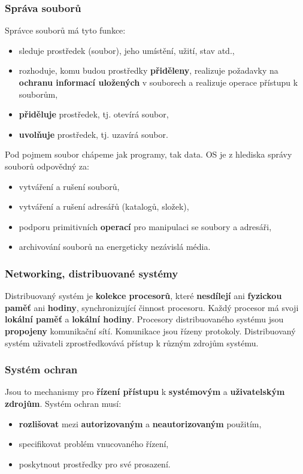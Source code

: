 \subsubsection{Správa souborů}
Správce souborů má tyto funkce:
\begin{itemize}
	\item sleduje prostředek (soubor), jeho umístění, užití, stav atd.,
	\item rozhoduje, komu budou prostředky \textbf{přiděleny}, realizuje požadavky na \textbf{ochranu informací uložených} v souborech a realizuje operace přístupu k souborům,
	\item \textbf{přiděluje} prostředek, tj. otevírá soubor,
	\item \textbf{uvolňuje} prostředek, tj. uzavírá soubor.
\end{itemize}
Pod pojmem soubor chápeme jak programy, tak data. OS je z hlediska správy souborů odpovědný za:
\begin{itemize}
	\item vytváření a rušení souborů,
	\item vytváření a rušení adresářů (katalogů, složek),
	\item podporu primitivních \textbf{operací} pro manipulaci se soubory a adresáři,
	\item archivování souborů na energeticky nezávislá média.
\end{itemize}
\subsubsection{Networking, distribuované systémy}
Distribuovaný systém je \textbf{kolekce procesorů}, které \textbf{nesdílejí} ani \textbf{fyzickou paměť} ani \textbf{hodiny}, synchronizující činnost procesoru. Každý procesor má svoji \textbf{lokální paměť} a \textbf{lokální hodiny}. Procesory distribuovaného systému jsou \textbf{propojeny} komunikační sítí. Komunikace jsou řízeny protokoly. Distribuovaný systém uživateli zprostředkovává přístup k různým zdrojům systému.

\subsubsection{Systém ochran}
Jsou to mechanismy pro \textbf{řízení přístupu} k \textbf{systémovým} a \textbf{uživatelským zdrojům}. Systém ochran musí:
\begin{itemize}
	\item \textbf{rozlišovat} mezi \textbf{autorizovaným} a \textbf{neautorizovaným} použitím,
	\item specifikovat problém vnucovaného řízení,
	\item poskytnout prostředky pro své prosazení.
\end{itemize}


